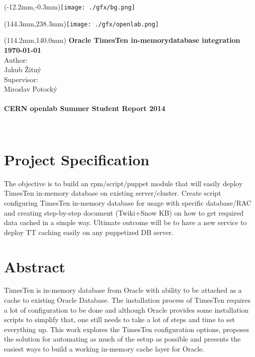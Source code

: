 \documentclass[11pt, letterpaper]{article}
\begin{document}
\begin{textblock*}{0mm}(-12.2mm,-0.3mm)\noindent \texttt{[image: ./gfx/bg.png]}\end{textblock*}
\begin{textblock*}{0mm}(144.3mm,238.3mm)\noindent \texttt{[image: ./gfx/openlab.png]}\end{textblock*}
\begin{textblock*}{150mm}(114.2mm,140.0mm)\noindent
{\bfseries\sffamily\textbf{\fontsize{20}{20}\selectfont\color{natc}Oracle TimesTen in-memory\newline database integration}}\\[36pt]
{\bfseries\sffamily\textbf{\fontsize{16}{20}\selectfont\color{natc}\motd\today}}\\[18pt]
{\sffamily\fontsize{14}{20}\selectfont\color{subc}Author:}\\
{\sffamily\fontsize{14}{20}\selectfont\color{subc}Jakub Žitný}\\[18pt]
{\sffamily\fontsize{14}{20}\selectfont\color{subc}Supervisor:}\\
{\sffamily\fontsize{14}{20}\selectfont\color{subc}Miroslav Potocký}\\
{\sffamily\fontsize{14}{20}\selectfont\color{subc}}\\[18pt]
\textbf{\bfseries\sffamily\fontsize{11}{20}\selectfont\color{subc}CERN openlab Summer Student Report 2014}

\end{textblock*}
~
\thispagestyle{empty}\newpage


\section*{Project Specification}
The objective is to build an rpm/script/puppet module that will easily deploy TimesTen in-memory database on existing server/cluster. Create script configuring TimesTen in-memory database for usage with specific database/RAC and creating step-by-step document (Twiki+Snow KB) on how to get required data cached in a simple way. Ultimate outcome will be to have a new service to deploy TT caching easily on any puppetized DB server.


\section*{Abstract}
TimesTen is in-memory database from Oracle with ability to be attached as a cache to existing Oracle Database. The installation process of TimesTen requires a lot of configuration to be done and although Oracle provides some installation scripts to simplify that, one still needs to take a lot of steps and time to set everything up. This work explores the TimesTen configuration options, proposes the solution for automating as much of the setup as possible and presents the easiest ways to build a working in-memory cache layer for Oracle.
\end{document}
